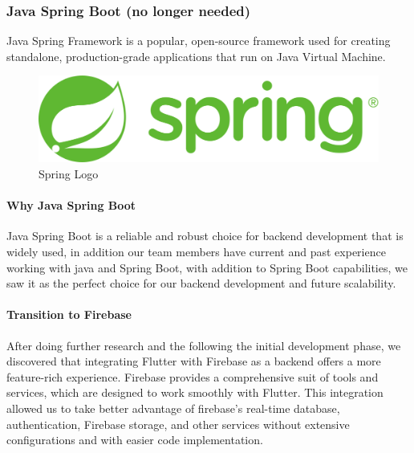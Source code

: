 \documentclass[a4paper, 12pt]{report} %
\begin{document}
            \subsubsection{Java Spring Boot (no longer needed)}
                Java Spring Framework is a popular, open-source framework used for creating standalone, production-grade applications that run on Java Virtual Machine. \cite{spring_wiki}
                \begin{figure}[h]
                    \centering
                    \includegraphics[width=1\textwidth]{Spring Boot Logo.png}
                    \caption{Spring Logo \cite{spring_logo}}
                    \label{fig:Spring Logo}
                \end{figure}
                \paragraph{Why Java Spring Boot} Java Spring Boot is a reliable and robust choice for backend development that is widely used, in addition our team members have current and past experience working with java and Spring Boot, with addition to Spring Boot capabilities, we saw it as the perfect choice for our backend development and future scalability.
                \paragraph{Transition to Firebase} After doing further research and the following the initial development phase, we discovered that integrating Flutter with Firebase as a backend offers a more feature-rich experience.
                Firebase provides a comprehensive suit of tools and services, which are designed to work smoothly with Flutter. This integration allowed us to take better advantage of firebase’s real-time database, authentication, Firebase storage, and other services without extensive configurations and with easier code implementation.
\end{document}
